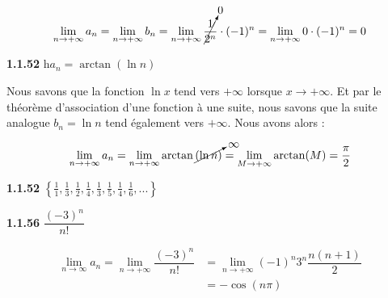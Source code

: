 \documentclass{report}
\begin{document}
    \begin{align*}
        \lim\limits_{n \to+\infty }a_n 
        = 
        \lim\limits_{n \to+\infty }b_n  
        =
        \lim\limits_{n \to+\infty }\cancelto{0}{\dfrac{1}{2^n}} \cdot (-1)^n  
        = \lim\limits_{n \to+\infty } 0 \cdot (-1)^n = 0  
    \end{align*}

    
    \noindent\textbf{1.1.52}  h$a_n = \arctan(\ln n)$ 

    Nous savons que la fonction $\ln x$ tend vers $+ \infty$ lorsque 
    $x \longrightarrow + \infty$. Et par le théorème d'association d'une 
    fonction à une suite, nous savons que la suite analogue $b_n = 
    \ln n$ tend également vers $+ \infty$. Nous avons alors :


    \begin{align*}
        \lim\limits_{n \to+\infty } a_n = 
        \lim\limits_{n \to+\infty } \arctan\cancelto{\infty}{(\ln n)} =
        \lim\limits_{M \to+\infty } \arctan(M) = \frac{\pi}{2} 
    \end{align*}        

    \vspace{1em}%

    \noindent\textbf{1.1.52}  
    $\left\{\frac11,\frac13,\frac12,\frac14,\frac13,\frac15,\frac14,\frac16,
    ...\right\}$ 

    \vspace{1em}


    \noindent \textbf{1.1.56}  $\dfrac{(-3)^n}{n!}$


    \begin{align*}
        \lim\limits_{n\to \infty} a_n = \lim\limits_{n \to+\infty }\dfrac{(-3)^n}{n!} 
        &= 
        \lim\limits_{n \to+\infty } (-1)^n 3^n \dfrac{n(n+1)}{2} \\ 
        &=
        -\cos(n\pi)
    \end{align*}
    
\end{document}

